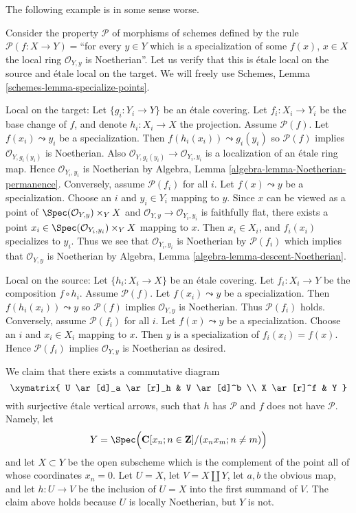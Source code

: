 \noindent
The following example is in some sense worse.

\begin{example}
\label{example-silly-two}
Consider the property $\mathcal{P}$ of morphisms of schemes defined
by the rule $\mathcal{P}(f : X \to Y) = $``for every $y \in Y$ which is
a specialization of some $f(x)$, $x \in X$ the local ring
$\mathcal{O}_{Y, y}$ is Noetherian''. Let us verify that this is
\'etale local on the source and \'etale local on the target. We will freely use
Schemes, Lemma \ref{schemes-lemma-specialize-points}.

\medskip\noindent
Local on the target:
Let $\{g_i : Y_i \to Y\}$ be an \'etale covering. Let $f_i : X_i \to Y_i$
be the base change of $f$, and denote $h_i : X_i \to X$ the projection.
Assume $\mathcal{P}(f)$. Let $f(x_i) \leadsto y_i$
be a specialization. Then $f(h_i(x_i)) \leadsto g_i(y_i)$ so
$\mathcal{P}(f)$ implies $\mathcal{O}_{Y, g_i(y_i)}$ is Noetherian.
Also $\mathcal{O}_{Y, g_i(y_i)} \to \mathcal{O}_{Y_i, y_i}$ is a
localization of an \'etale ring map.
Hence $\mathcal{O}_{Y_i, y_i}$ is Noetherian by
Algebra, Lemma \ref{algebra-lemma-Noetherian-permanence}.
Conversely, assume $\mathcal{P}(f_i)$ for all $i$. Let $f(x) \leadsto y$
be a specialization. Choose an $i$ and $y_i \in Y_i$ mapping to $y$.
Since $x$ can be viewed as a point of
$\Spec(\mathcal{O}_{Y, y}) \times_Y X$ and
$\mathcal{O}_{Y, y} \to \mathcal{O}_{Y_i, y_i}$ is faithfully flat,
there exists a point
$x_i \in \Spec(\mathcal{O}_{Y_i, y_i}) \times_Y X$
mapping to $x$. Then $x_i \in X_i$, and $f_i(x_i)$ specializes to $y_i$.
Thus we see that $\mathcal{O}_{Y_i, y_i}$ is Noetherian by
$\mathcal{P}(f_i)$ which implies that $\mathcal{O}_{Y, y}$ is
Noetherian by
Algebra, Lemma \ref{algebra-lemma-descent-Noetherian}.

\medskip\noindent
Local on the source:
Let $\{h_i : X_i \to X\}$ be an \'etale covering. Let $f_i : X_i \to Y$
be the composition $f \circ h_i$. Assume $\mathcal{P}(f)$. Let
$f(x_i) \leadsto y$ be a specialization. Then $f(h_i(x_i)) \leadsto y$ so
$\mathcal{P}(f)$ implies $\mathcal{O}_{Y, y}$ is Noetherian. Thus
$\mathcal{P}(f_i)$ holds.
Conversely, assume $\mathcal{P}(f_i)$ for all $i$. Let $f(x) \leadsto y$
be a specialization. Choose an $i$ and $x_i \in X_i$ mapping to $x$.
Then $y$ is a specialization of $f_i(x_i) = f(x)$. Hence
$\mathcal{P}(f_i)$ implies $\mathcal{O}_{Y, y}$ is Noetherian
as desired.

\medskip\noindent
We claim that there exists a commutative diagram
$$
\xymatrix{
U \ar[d]_a \ar[r]_h & V \ar[d]^b \\
X \ar[r]^f & Y
}
$$
with surjective \'etale vertical arrows, such that $h$ has $\mathcal{P}$
and $f$ does not have $\mathcal{P}$. Namely, let
$$
Y =
\Spec\Big(
\mathbf{C}[x_n; n \in \mathbf{Z}]/(x_n x_m; n \not = m)
\Big)
$$
and let $X \subset Y$ be the open subscheme which is the complement of
the point all of whose coordinates $x_n = 0$. Let $U = X$, let
$V = X \coprod Y$, let $a, b$ the obvious map, and let $h : U \to V$
be the inclusion of $U = X$ into the first summand of $V$. The claim above
holds because $U$ is locally Noetherian, but $Y$ is not.
\end{example}


